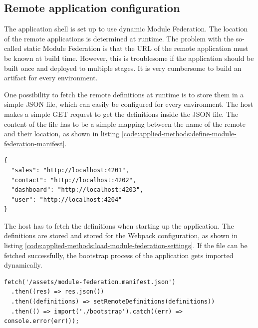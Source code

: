 \subsection{Remote application configuration}\label{subsection:applied-methods:prototypical-implementation
:load-remote-settings}

The application shell is set up to use dynamic Module Federation. The location of the remote applications is determined at runtime. The problem with the so-called static Module Federation is that the \ac{URL} of the remote application must be known at build time. However, this is troublesome if the application should be built once and deployed to multiple stages. It is very cumbersome to build an artifact for every environment.

\bigskip

\noindent One possibility to fetch the remote definitions at runtime is to store them in a simple \ac{JSON} file, which can easily be configured for every environment. The host makes a simple GET request to get the definitions inside the \ac{JSON} file. The content of the file has to be a simple mapping between the name of the remote and their location, as shown in listing \ref{code:applied-methods:define-module-federation-manifest}.

\ifshowListings
\begin{listing}[H]
\begin{verbatim}
{
  "sales": "http://localhost:4201",
  "contact": "http://localhost:4202",
  "dashboard": "http://localhost:4203",
  "user": "http://localhost:4204"
}
\end{verbatim}
\caption{Loading micro-frontend \acp{URL} during startup.}\label{code:applied-methods:define-module-federation-manifest}
\end{listing}
\fi

\noindent The host has to fetch the definitions when starting up the application. The definitions are stored and stored for the Webpack configuration, as shown in listing \ref{code:applied-methods:load-module-federation-settings}. If the file can be fetched successfully, the bootstrap process of the application gets imported dynamically.

\ifshowListings
\begin{listing}[H]
\begin{verbatim}
fetch('/assets/module-federation.manifest.json')
  .then((res) => res.json())
  .then((definitions) => setRemoteDefinitions(definitions))
  .then(() => import('./bootstrap').catch((err) => console.error(err)));
\end{verbatim}
\caption{Loading micro-frontend \acp{URL} during initialization.}\label{code:applied-methods:load-module-federation-settings}
\end{listing}
\fi

